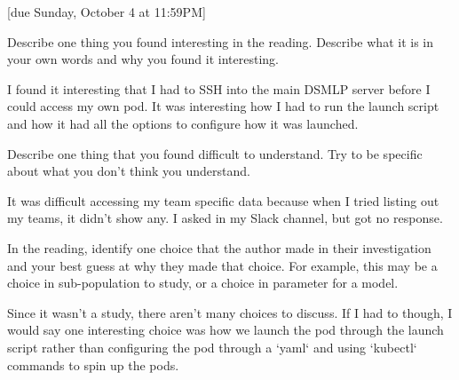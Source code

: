 \documentclass{article}
\begin{document}
[due Sunday, October 4 at 11:59PM]

\begin{probset}
\begin{prob}
    Describe one thing you found interesting in the reading. Describe what it is in your own words and why you found it interesting.

    \begin{soln}
        I found it interesting that I had to SSH into the main DSMLP server before I could access my own pod. It was interesting how I had to run the launch script and how it had all the options to configure how it was launched.
    \end{soln}
\end{prob}

\begin{prob}
    Describe one thing that you found difficult to understand. Try to be specific about what you don't think you understand.

    \begin{soln}
        It was difficult accessing my team specific data because when I tried listing out my teams, it didn't show any. I asked in my Slack channel, but got no response. 
    \end{soln}
\end{prob}

\begin{prob}
    In the reading, identify one choice that the author made in their investigation and your best guess at why they made that choice. For example, this may be a choice in sub-population to study, or a choice in parameter for a model.

    \begin{soln}
        Since it wasn't a study, there aren't many choices to discuss. If I had to though, I would say one interesting choice was how we launch the pod through the launch script rather than configuring the pod through a `yaml` and using `kubectl` commands to spin up the pods.
    \end{soln}
\end{prob}
\end{probset}
\end{document}
